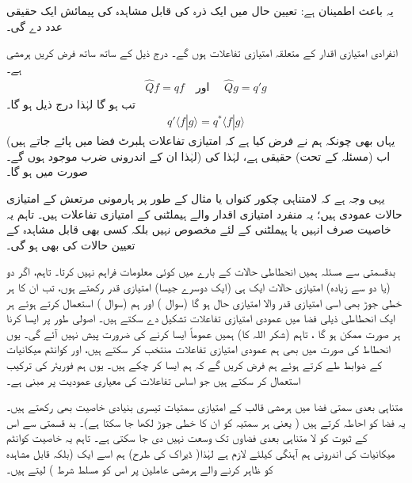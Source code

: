   یہ باعث اطمینان ہے:   تعیین حال میں ایک ذرہ کی  قابل مشاہدہ  کی پیمائش ایک حقیقی عدد دے گی۔ 
   
انفرادی امتیازی اقدار کے متعلقہ امتیازی تفاعلات  ہوں گے۔  
درج ذیل کے ساتھ ساتھ  فرض کریں     ہرمشی ہے۔
\begin{align*}
\hat{Q}f = qf  \quad \text{اور }\quad  \hat{Q}g=q'g
\end{align*}
  تب  ہو گا  لہٰذا  درج ذیل ہو گا۔
\begin{align*}
q' \langle f | g \rangle = q^{*} \langle f | g \rangle
\end{align*}
(یہاں بھی چونکہ ہم نے فرض کیا ہے کہ امتیازی تفاعلات   ہلبرٹ فضا  میں پائے جاتے ہیں لہٰذا  ان کے  اندرونی ضرب موجود ہوں  گے۔)   اب (مسئلہ  کے تحت)   حقیقی ہے،    لہٰذا    کی صورت میں    ہو گا۔  

یہی وجہ ہے کہ لامتناہی چکور کنواں یا مثال کے طور پر ہارمونی مرتعش کے امتیازی حالات عمودی ہیں؛   یہ منفرد امتیازی اقدار والے  ہیملٹنی کے امتیازی تفاعلات   ہیں۔  تاہم  یہ خاصیت صرف انہیں    یا  ہیملٹنی کے لئے  مخصوص  نہیں    بلکہ کسی بھی قابل مشاہدہ  کے تعیین  حالات کی بھی ہو گی۔

  بدقسمتی سے مسئلہ    ہمیں انحطاطی حالات  کے بارے میں کوئی معلومات فراہم نہیں کرتا۔  تاہم،  اگر دو (یا دو سے زیادہ)  امتیازی حالات ایک ہی (ایک دوسرے جیسا)  امتیازی قدر رکھتے ہوں،  تب ان کا  ہر خطی جوڑ  بھی اسی امتیازی قدر والا امتیازی حال ہو گا  (سوال   )  اور ہم  (سوال )  استعمال کرتے ہوئے ہر ایک انحطاطی ذیلی فضا  میں عمودی امتیازی تفاعلات  تشکیل دے  سکتے ہیں۔  اصولی طور پر  ایسا کرنا ہر صورت  ممکن ہو گا ،  تاہم (شکر اللہ کا)  ہمیں عموماً    ایسا کرنے کی ضرورت پیش نہیں آئے گی۔  یوں انحطاط کی صورت  میں بھی ہم عمودی امتیازی تفاعلات  منتخب کر سکتے ہیں،   اور کوانٹم میکانیات کے ضوابط  طے کرتے ہوئے ہم فرض کریں گے  کہ ہم ایسا کر چکے ہیں۔  یوں ہم فوریئر کی ترکیب استعمال کر سکتے ہیں   جو   اساس تفاعلات   کی معیاری عمودیت پر مبنی ہے۔
  
     متناہی بعدی  سمتی  فضا  میں ہرمشی قالب کے امتیازی سمتیات   تیسری بنیادی خاصیت بھی رکھتے ہیں۔  یہ  فضا  کو احاطہ کرتے ہیں (  یعنی ہر سمتیہ کو ان کا خطی جوڑ لکھا جا سکتا ہے)۔  بد قسمتی سے اس کے  ثبوت کو  لا متناہی بعدی   فضاوں   تک وسعت  نہیں دی جا سکتی  ہے۔  تاہم یہ خاصیت کوانٹم میکانیات کی اندرونی ہم آہنگی کیلئے لازم ہے   لہٰذا(   ڈیراک کی طرح)  ہم اسے ایک    (بلکہ  قابل مشاہدہ کو ظاہر کرنے والے ہرمشی عاملین پر اس  کو مسلط شرط ) لیتے ہیں۔
     
